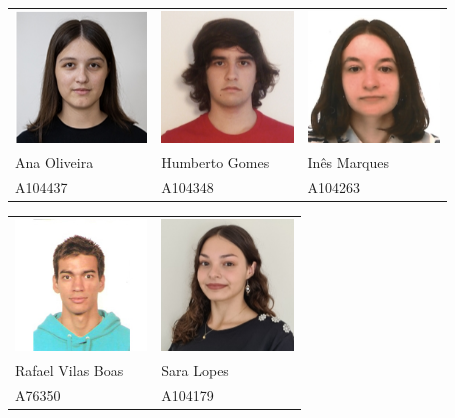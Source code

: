 \documentclass[12pt, a4paper]{article}
\begin{document}
\vspace{2cm}
\begin{center}
    \begin{tabular}{>{\centering}p{}
                    >{\centering}p{}
                    >{\centering\arraybackslash}p{}}
        \includegraphics[width=3.5cm]{res/cover/A104437.png} &
        \includegraphics[width=3.5cm]{res/cover/A104348.png} &
        \includegraphics[width=3.5cm]{res/cover/A104263.png}  \\

        Ana Oliveira & Humberto Gomes & Inês Marques \\
        A104437      & A104348        & A104263
    \end{tabular}

    \begin{tabular}{>{\centering}p{}
                    >{\centering\arraybackslash}p{}}
        \includegraphics[width=3.5cm]{res/cover/A76350.jpg} &
        \includegraphics[width=3.5cm]{res/cover/A104179.png} \\

        Rafael Vilas Boas & Sara Lopes \\
        A76350            & A104179
    \end{tabular}
\end{center}
\end{document}
